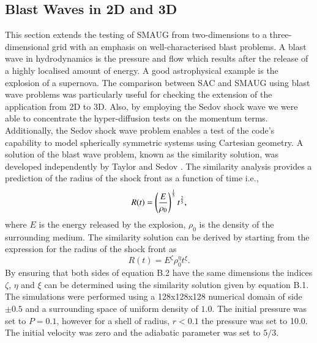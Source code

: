 \documentclass[final,1p]{elsarticle}
\begin{document}







\subsection{Blast Waves in 2D and 3D}
This section extends the testing of SMAUG from two-dimensions to a three-dimensional grid with an emphasis on well-characterised blast problems. A blast wave in hydrodynamics is the pressure and flow which results after the release of a highly localised amount of energy. A good astrophysical example is the explosion of a supernova. The comparison between SAC  and SMAUG using blast wave problems was particularly useful for checking the extension of the application from 2D to 3D. Also, by employing the Sedov shock wave we were able to concentrate the hyper-diffusion tests on the momentum terms. Additionally, the Sedov shock wave problem enables a test of the code's capability to model spherically symmetric systems using Cartesian geometry. A solution of the blast wave problem, known as the similarity solution, was developed independently by Taylor \cite{Taylor1950} and Sedov \cite{Sedov1946}. The similarity analysis provides a prediction of the radius of the shock front as a function of time i.e.,
\begin{equation}\label{eqblast1}
R(t)=\left({{E}\over{\rho_{0}}}\right)^{{1}\over{5}}t^{{2}\over{5}},
\end{equation}
where $E$ is the energy released by the explosion, $\rho_{0}$  is the density of the surrounding medium. The similarity solution can be derived by starting from the expression for the radius of the shock front as
\begin{equation}\label{eqblast2}
R(t)=E^{\zeta}\rho_{0}^{\eta}t^{\xi}.
\end{equation}
By ensuring that both sides of equation B.2
have the same dimensions the indices $\zeta$, $\eta$ and $\xi$ can be determined using the similarity solution given by equation B.1.  
The simulations were performed using a  128x128x128 numerical domain of side $\pm0.5$ and a surrounding space of uniform density of    $\mathrm{1.0}$. The initial pressure was set to $P=0.1$, however for a shell of radius, $r<0.1$ the pressure was set to 10.0.
The initial velocity was zero and the adiabatic parameter was set to $5/3$.
\end{document}
